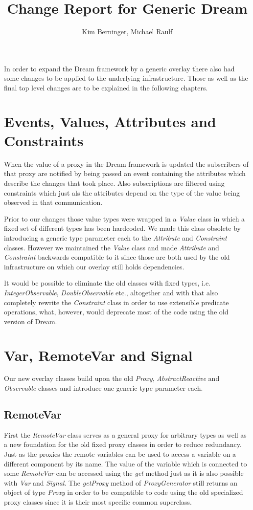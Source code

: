 \documentclass[11pt]{article}
\title{Change Report for Generic Dream}
\author{Kim Berninger, Michael Raulf}
\date{}
\begin{document}
\maketitle

In order to expand the Dream framework by a generic overlay there also had some changes to be applied to the underlying infrastructure.
Those as well as the final top level changes are to be explained in the following chapters.

\section{Events, Values, Attributes and Constraints}
When the value of a proxy in the Dream framework is updated the subscribers of that proxy are notified by being passed an event containing the attributes which describe the changes that took place.
Also subscriptions are filtered using constraints which just als the attributes depend on the type of the value being observed in that communication.

Prior to our changes those value types were wrapped in a \emph{Value} class in which a fixed set of different types has been hardcoded.
We made this class obsolete by introducing a generic type parameter each to the \emph{Attribute} and \emph{Constraint} classes.
However we maintained the \emph{Value} class and made \emph{Attribute} and \emph{Constraint} backwards compatible to it since those are both used by the old infrastructure on which our overlay still holds dependencies.

It would be possible to eliminate the old classes with fixed types, i.e. \emph{IntegerObservable}, \emph{DoubleObservable} etc., altogether and with that also completely rewrite the \emph{Constraint} class in order to use extensible predicate operations, what, however, would deprecate most of the code using the old version of Dream.

\section{Var, RemoteVar and Signal}
Our new overlay classes build upon the old \emph{Proxy}, \emph{AbstractReactive} and \emph{Observable} classes and introduce one generic type parameter each.

\subsection{RemoteVar}
First the \emph{RemoteVar} class serves as a general proxy for arbitrary types as well as a new foundation for the old fixed proxy classes in order to reduce redundancy.
Just as the proxies the remote variables can be used to access a variable on a different component by its name.
The value of the variable which is connected to some \emph{RemoteVar} can be accessed using the \emph{get} method just as it is also possible with \emph{Var} and \emph{Signal}.
The \emph{getProxy} method of \emph{ProxyGenerator} still returns an object of type \emph{Proxy} in order to be compatible to code using the old specialized proxy classes since it is their most specific common superclass.
\end{document}
